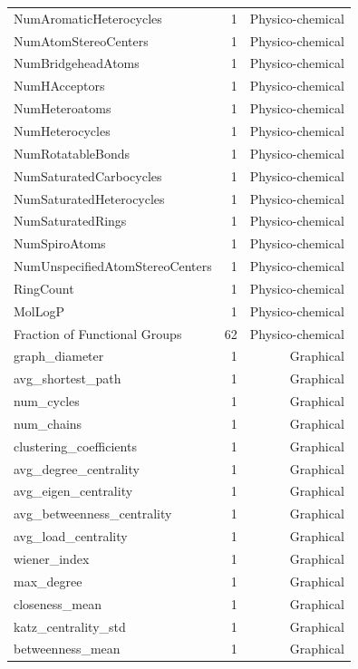 \documentclass{article}
\begin{document}
\begin{table}[!ht]
\begin{tabular}{lrr}
NumAromaticHeterocycles  & 1   & Physico-chemical \\
NumAtomStereoCenters     & 1   & Physico-chemical \\
NumBridgeheadAtoms       & 1   & Physico-chemical \\
NumHAcceptors            & 1   & Physico-chemical \\
NumHeteroatoms           & 1   & Physico-chemical \\
NumHeterocycles          & 1   & Physico-chemical \\
NumRotatableBonds        & 1   & Physico-chemical \\
NumSaturatedCarbocycles  & 1   & Physico-chemical \\
NumSaturatedHeterocycles & 1   & Physico-chemical \\
NumSaturatedRings        & 1   & Physico-chemical \\
NumSpiroAtoms            & 1   & Physico-chemical \\
NumUnspecifiedAtomStereoCenters & 1 & Physico-chemical \\
RingCount                & 1   & Physico-chemical \\
MolLogP                  & 1   & Physico-chemical \\
Fraction of Functional Groups & 62 & Physico-chemical \\
graph\_diameter          & 1   & Graphical \\
avg\_shortest\_path      & 1   & Graphical \\
num\_cycles              & 1   & Graphical \\
num\_chains              & 1   & Graphical \\
clustering\_coefficients & 1   & Graphical \\
avg\_degree\_centrality  & 1   & Graphical \\
avg\_eigen\_centrality   & 1   & Graphical \\
avg\_betweenness\_centrality & 1 & Graphical \\
avg\_load\_centrality    & 1   & Graphical \\
wiener\_index            & 1   & Graphical \\
max\_degree              & 1   & Graphical \\
closeness\_mean          & 1   & Graphical \\
katz\_centrality\_std    & 1   & Graphical \\
betweenness\_mean        & 1   & Graphical \\

\end{tabular}
\end{table}
\end{document}
